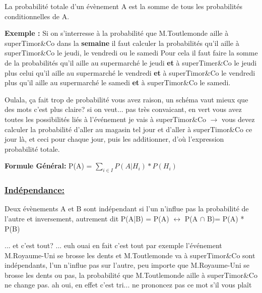 \documentclass[a4paper]{article}
\begin{document}
\begin{rappel}
La probabilité totale d'un évènement A est la somme de tous les probabilités conditionnelles de A.
\end{rappel}

\newpage

\textbf{Exemple :} Si on s'interresse à la probabilité que M.Toutlemonde aille à superTimor\&Co dans la \textbf{semaine} il faut calculer la probabilités qu'il aille à superTimor\&Co le jeudi, le vendredi ou le samedi
Pour cela il faut faire la somme de la probabilités qu'il aille au supermarché le jeudi \textbf{et} à superTimer\&Co le jeudi plus celui qu'il aille au supermarché le vendredi \textbf{et} à superTimor\&Co le vendredi plus qu'il aille au supermarché le samedi \textbf{et} à superTimor\&Co le samedi.
\begin{dialogue}
 Oulala, ça fait trop de probabilité
 vous avez raison, un schéma vaut mieux que des mots
\newline
{\centering {}}
\newline
{} c'est plus claire?
 si on veut...
 pas très convaicant, en vert vous avez toutes les possibilités liés à l'événement je vais à superTimor\&Co $\rightarrow$ vous devez calculer la probabilité d'aller au magasin tel jour  et d'aller à superTimor\&Co ce jour là, et ceci pour chaque jour, puis les additionner, d'où l'expression probabilité totale.
\end{dialogue}

\textbf{Formule Général:}
P(A) = $\displaystyle{\sum_{i \in I} P(A|H_i) * P(H_i)}$

\subsubsection{{\underline{Indépendance:}}}

\begin{rappel}
Deux évènements A et B sont indépendant si l'un n'influe pas la probabilité de l'autre et inversement, autrement dit
P(A|B) = P(A) $\leftrightarrow$ P(A $\cap$ B)= P(A) * P(B)
\end{rappel}
\begin{dialogue}
 ... et c'est tout?
 ... euh ouai en fait c'est tout \newline par exemple l'événement M.Royaume-Uni se brosse les dents
et M.Toutlemonde va à superTimor\&Co sont indépendants, l'un n'influe pas sur l'autre, peu importe que M.Royaume-Uni se brosse les dents ou pas, la probabilité que M.Toutlemonde aille à superTimor\&Co ne change pas.
 ah oui, en effet c'est tri...
 ne prononcez pas ce mot s'il vous plaît
\end{dialogue}
\end{document}
